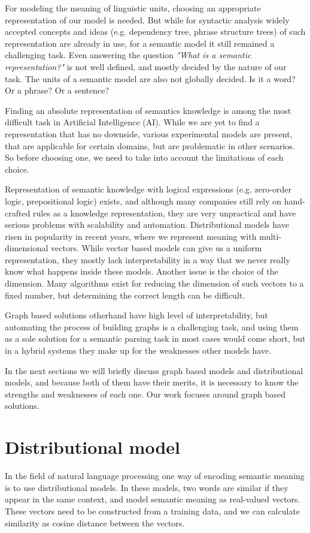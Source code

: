 For modeling the meaning of linguistic units, choosing an appropriate representation of our model is needed. But while for syntactic analysis widely accepted concepts and ideas (e.g. dependency tree, phrase structure trees) of such representation are already in use, for a semantic model it still remained a challenging task. Even answering the question \textit{"What is a semantic representation?"} is not well defined, and mostly decided by the nature of our task. The units of a semantic model are also not globally decided. Is it a word? Or a phrase? Or a sentence?

Finding an absolute representation of semantics knowledge is among the most difficult task in Artificial Intelligence (AI). While we are yet to find a representation that has no downside, various experimental models are present, that are applicable for certain domains, but are problematic in other scenarios. So before choosing one, we need to take into account the limitations of each choice. 


Representation of semantic knowledge with logical expressions (e.g. zero-order logic, prepositional logic) exists, and although many companies still rely on hand-crafted rules as a knowledge representation, they are very unpractical and have serious problems with scalability and automation. Distributional models have risen in popularity in recent years, where we represent meaning with multi-dimensional vectors. While vector based models can give us a uniform representation, they mostly lack interpretability in a way that we never really know what happens inside these models. Another issue is the choice of the dimension. Many algorithms exist for reducing the dimension of such vectors to a fixed number, but determining the correct length can be difficult.

Graph based solutions otherhand have high level of interpretability, but automating the process of building graphs is a challenging task, and using them as a sole solution for a semantic parsing task in most cases would come short, but in a hybrid systems they make up for the weaknesses other models have.

 In the next sections we will briefly discuss graph based models and distributional models, and because both of them have their merits, it is necessary to know the strengths and weaknesses of each one. Our work focuses around graph based solutions.

\section{Distributional model}
In the field of natural language processing one way of encoding semantic meaning is to use distributional models. In these models, two words are similar if they appear in the same context, and model semantic meaning as real-valued vectors. These vectors need to be constructed from a training data, and we can calculate similarity as cosine distance between the vectors.

